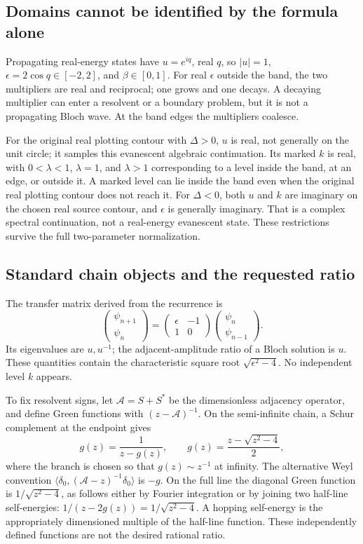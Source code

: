 \subsection{Domains cannot be identified by the formula alone}
Propagating real-energy states have \(u=e^{iq}\), real \(q\), so \(|u|=1\), \(\epsilon=2\cos q\in[-2,2]\), and \(\beta\in[0,1]\). For real \(\epsilon\) outside the band, the two multipliers are real and reciprocal; one grows and one decays. A decaying multiplier can enter a resolvent or a boundary problem, but it is not a propagating Bloch wave. At the band edges the multipliers coalesce.

For the original real plotting contour with \(\Delta>0\), \(u\) is real, not generally on the unit circle; it samples this evanescent algebraic continuation. Its marked \(k\) is real, with \(0<\lambda<1\), \(\lambda=1\), and \(\lambda>1\) corresponding to a level inside the band, at an edge, or outside it. A marked level can lie inside the band even when the original real plotting contour does not reach it. For \(\Delta<0\), both \(u\) and \(k\) are imaginary on the chosen real source contour, and \(\epsilon\) is generally imaginary. That is a complex spectral continuation, not a real-energy evanescent state. These restrictions survive the full two-parameter normalization.

\subsection{Standard chain objects and the requested ratio}
The transfer matrix derived from the recurrence is
\[
\begin{pmatrix}\psi_{n+1}\\\psi_n\end{pmatrix}
=\begin{pmatrix}\epsilon&-1\\1&0\end{pmatrix}
\begin{pmatrix}\psi_n\\\psi_{n-1}\end{pmatrix}.
\]
Its eigenvalues are \(u,u^{-1}\); the adjacent-amplitude ratio of a Bloch solution is \(u\). These quantities contain the characteristic square root \(\sqrt{\epsilon^2-4}\). No independent level \(k\) appears.

To fix resolvent signs, let \(\mathcal A=S+S^*\) be the dimensionless adjacency operator, and define Green functions with \((z-\mathcal A)^{-1}\). On the semi-infinite chain, a Schur complement at the endpoint gives
\[
g(z)=\frac1{z-g(z)},\qquad
g(z)=\frac{z-\sqrt{z^2-4}}2,
\]
where the branch is chosen so that \(g(z)\sim z^{-1}\) at infinity. The alternative Weyl convention \(\langle\delta_0,(\mathcal A-z)^{-1}\delta_0\rangle\) is \(-g\). On the full line the diagonal Green function is \(1/\sqrt{z^2-4}\), as follows either by Fourier integration or by joining two half-line self-energies:
\(1/(z-2g(z))=1/\sqrt{z^2-4}\). A hopping self-energy is the appropriately dimensioned multiple of the half-line function. These independently defined functions are not the desired rational ratio.

